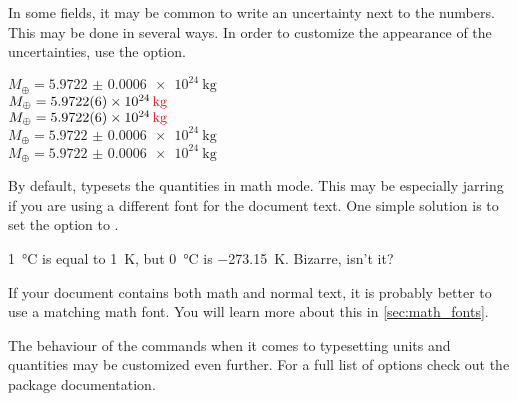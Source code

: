 In some fields, it may be common to write an uncertainty next to the numbers.
This may be done in several ways. In order to customize the appearance of the
uncertainties, use the  option.
\begin{example}
\(M_{\oplus} = \qty{
  5.9722(6) e24}{\kg}\)
  \\ %
\(M_{\oplus} = \qty{
  5.9722 +- 0.0006 e24}{\kg}\)
  \\ %
\(M_{\oplus} = \qty{
  5.9722 \pm 0.0006 e24}{\kg}\)
  \\ %
\(M_{\oplus} = \qty[
    uncertainty-mode = separate
  ]{5.9722(6) e24}{\kg}\)
  \\ %
\(M_{\oplus} = \qty[
  uncertainty-mode = full
]{5.9722(6) e24}{\kg}\)
\end{example}

By default,  typesets the quantities in math mode. This may be
especially jarring if you are using a different font for the document text. One
simple solution is to set the  option to .
\begin{example}
\setmainfont{Source Sans Pro} %
\qty{1}{\degreeCelsius} is
equal to \qty{1}{\kelvin},
but \qty[
  mode = text,
]{0}{\degreeCelsius} is \qty[
  mode = text,
]{-273.15}{\kelvin}.
Bizarre, isn't it?
\end{example}
If your document contains both math and normal text, it is probably better to
use a matching math font. You will learn more about this in
\autoref{sec:math_fonts}.

The behaviour of the commands when it comes to typesetting units and quantities
may be customized even further. For a full list of options check out the
 package documentation.

